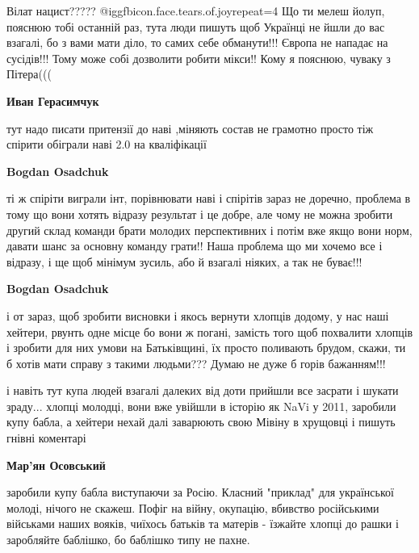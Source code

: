\begin{itemize}
\begin{itemize}
\begin{itemize}
Вілат нацист????? @igg{fbicon.face.tears.of.joy}{repeat=4}  Що ти мелеш йолуп, пояснюю тобі останній раз, тута
люди пишуть щоб Українці не йшли до вас взагалі, бо з вами мати діло, то самих
себе обманути!!! Європа не нападає на сусідів!!! Тому може собі дозволити
робити мікси!! Кому я пояснюю, чуваку з Пітера(((

\end{itemize} %

\textbf{Иван Герасимчук} 

тут надо писати притензії до наві ,міняють состав не грамотно просто тіж
спірити обіграли наві 2.0 на кваліфікації

\begin{itemize} %
\textbf{Bogdan Osadchuk} 

ті ж спіріти виграли інт, порівнювати наві і спірітів зараз не доречно,
проблема в тому що вони хотять відразу результат і це добре, але чому не можна
зробити другий склад команди брати молодих перспективних і потім вже якщо вони
норм, давати шанс за основну команду грати!! Наша проблема що ми хочемо все і
відразу, і ще щоб мінімум зусиль, або й взагалі ніяких, а так не буває!!!

\textbf{Bogdan Osadchuk} 

і от зараз, щоб зробити висновки і якось вернути хлопців додому, у нас наші
хейтери, рвунть одне місце бо вони ж погані, замість того щоб похвалити хлопців
і зробити для них умови на Батьківщині, їх просто поливають брудом, скажи, ти б
хотів мати справу з такими людьми??? Думаю не дуже б горів бажанням!!!

\end{itemize} %

\end{itemize} %


і навіть тут купа людей взагалі далеких від доти прийшли все засрати і шукати
зраду... хлопці молодці, вони вже увійшли в історію як NaVi у 2011, заробили
купу бабла, а хейтери нехай далі заварюють свою Мівіну в хрущовці і пишуть
гнівні коментарі

\begin{itemize} %
\textbf{Мар'ян Осовський} 

заробили купу бабла виступаючи за Росію. Класний "приклад" для української
молоді, нічого не скажеш. Пофіг на війну, окупацію, вбивство російськими
військами наших вояків, чиїхось батьків та матерів - їзжайте хлопці до рашки і
заробляйте баблішко, бо баблішко типу не пахне.


\end{itemize}
\end{itemize}
